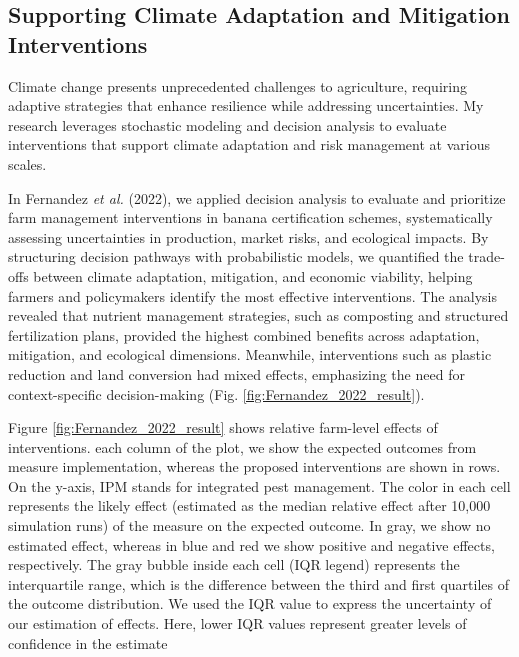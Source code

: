 \documentclass[
]{article}
\begin{document}
\hypertarget{supporting-climate-adaptation-and-mitigation-interventions}{%
\subsection{Supporting Climate Adaptation and Mitigation
Interventions}\label{supporting-climate-adaptation-and-mitigation-interventions}}

Climate change presents unprecedented challenges to agriculture,
requiring adaptive strategies that enhance resilience while addressing
uncertainties. My research leverages stochastic modeling and decision
analysis to evaluate interventions that support climate adaptation and
risk management at various scales.

In Fernandez \emph{et al.} (2022), we applied decision analysis to
evaluate and prioritize farm management interventions in banana
certification schemes, systematically assessing uncertainties in
production, market risks, and ecological impacts. By structuring
decision pathways with probabilistic models, we quantified the
trade-offs between climate adaptation, mitigation, and economic
viability, helping farmers and policymakers identify the most effective
interventions. The analysis revealed that nutrient management
strategies, such as composting and structured fertilization plans,
provided the highest combined benefits across adaptation, mitigation,
and ecological dimensions. Meanwhile, interventions such as plastic
reduction and land conversion had mixed effects, emphasizing the need
for context-specific decision-making (Fig.
\ref{fig:Fernandez_2022_result}).

Figure \ref{fig:Fernandez_2022_result} shows relative farm-level effects
of interventions. each column of the plot, we show the expected outcomes
from measure implementation, whereas the proposed interventions are
shown in rows. On the y-axis, IPM stands for integrated pest management.
The color in each cell represents the likely effect (estimated as the
median relative effect after 10,000 simulation runs) of the measure on
the expected outcome. In gray, we show no estimated effect, whereas in
blue and red we show positive and negative effects, respectively. The
gray bubble inside each cell (IQR legend) represents the interquartile
range, which is the difference between the third and first quartiles of
the outcome distribution. We used the IQR value to express the
uncertainty of our estimation of effects. Here, lower IQR values
represent greater levels of confidence in the estimate
\end{document}
